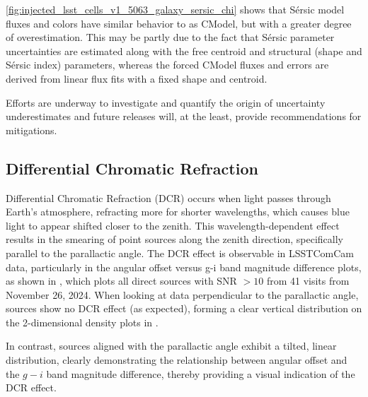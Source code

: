 \ref{fig:injected_lsst_cells_v1_5063_galaxy_sersic_chi} shows that S\'ersic model fluxes and colors have similar behavior to as CModel, but with a greater degree of overestimation.
This may be partly due to the fact that S\'ersic parameter uncertainties are estimated along with the free centroid and structural (shape and S\'ersic index) parameters, whereas the forced CModel fluxes and errors are derived from linear flux fits with a fixed shape and centroid.

Efforts are underway to investigate and quantify the origin of uncertainty underestimates and future releases will, at the least, provide recommendations for mitigations.

\subsection{Differential Chromatic Refraction}
\label{sec:differential_chromatic_refraction}
\gls{Differential Chromatic Refraction} (DCR) occurs when light passes through Earth’s atmosphere, refracting more for shorter wavelengths, which causes blue light to appear shifted closer to the zenith.
This wavelength-dependent effect results in the smearing of point sources along the zenith direction, specifically parallel to the parallactic angle.
The DCR effect is observable in LSSTComCam data, particularly in the angular offset versus g-i band magnitude difference plots,  as shown in , which plots all direct sources with \gls{SNR} $>10$ from 41 visits from November 26, 2024.
When looking at data perpendicular to the parallactic angle, sources show no DCR effect (as expected), forming a clear vertical distribution on the 2-dimensional density plots in .

In contrast, sources aligned with the parallactic angle exhibit a tilted, linear distribution, clearly demonstrating the relationship between angular offset and the $g-i$ band magnitude difference, thereby providing a visual indication of the \gls{DCR} effect.

